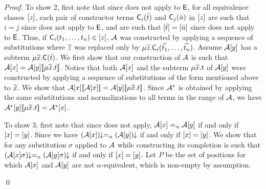\begin{proof}
To show 2,
first note that since  does not apply to $\mathsf{E}$,
for all equivalence classes $[z]$,
each pair of constructor terms $\textsf{C}_i( \bar t )$ and $\textsf{C}_j( \bar u )$ in $[z]$
are such that $i = j$ since  does not apply to $\mathsf{E}$,
and are such that $[ \bar t ] = [ \bar u ]$ since  does not apply to $\mathsf{E}$.
Thus, 
if $\textsf{C}_i( t_1, \ldots, t_n ) \in [z]$,
$\mathcal{A}$ was constructed by applying a sequence of substitutions
where ${\widetilde{z}}$ was replaced only by $\mu {\widetilde{z}}. \textsf{C}_i( {\widetilde{t_1}}, \ldots, {\widetilde{t_n}} )$.
Assume $\mathcal{A} [y]$ has a subterm $\mu {\widetilde{x}}. \textsf{C}( \bar t )$.
We first show that our construction of $\mathcal{A}$ is such that $\mathcal{A} [x] = \mathcal{A} [y][\![  \mu {\widetilde{x}}. t  ]\!]$.
Notice that both $\mathcal{A} [x]$ and the subterm $\mu {\widetilde{x}}. t$ of $\mathcal{A} [y]$ were
constructed by applying a sequence of substitutions of the form mentioned above to ${\widetilde{x}}$.
We show that $\mathcal{A} [x] [\![  \mathcal{A} [x]  ]\!] = \mathcal{A} [y] [\![  \mu {\widetilde{x}}.t  ]\!]$.
Since $\mathcal{A}^\ast$ is obtained by applying the same substitutions and normalizations to all terms in the range of $\mathcal{A}$,
we have $\mathcal{A}^\ast [y] [\![  \mu {\widetilde{x}}. t ]\!] = \mathcal{A}^\ast [x]$.

To show 3,
first note that since  does not apply,
$\mathcal{A} [x] \mathrel{=_\alpha} \mathcal{A} [y]$ if and only if $[x] = [y]$.
Since 
we have ${(\mathcal{A} [x])}\!\!\downarrow \mathrel{=_\alpha} {(\mathcal{A} [y])}\!\!\downarrow$ if and only if $[x] = [y]$.
We show that for any substitution $\sigma$ applied to $\mathcal{A}$ while constructing its completion is such that
${(\mathcal{A} [x] \sigma)}\!\!\downarrow \mathrel{=_\alpha} {(\mathcal{A} [y] \sigma)}\!\!\downarrow$ if and only if $[x] = [y]$.
Let $P$ be the set of positions for which $\mathcal{A} [x]$ and $\mathcal{A} [y]$ are not $\alpha$-equivalent,
which is non-empty by assumption.

\qed
\end{proof}

